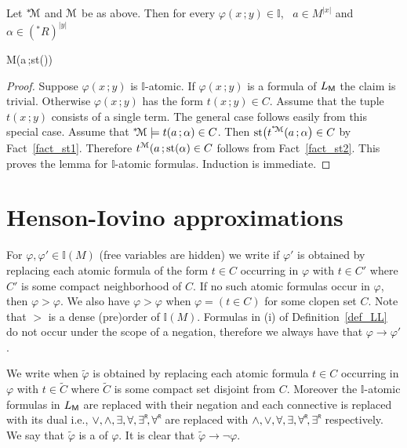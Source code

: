 \documentclass[11pt,oneside]{amsart}
\renewcommand*{\emph}[1]{%
   \smash{\tikz[baseline]\node[rectangle, fill=teal!25, rounded corners, inner xsep=0.5ex, inner ysep=0.2ex, anchor=base, minimum height = 2.7ex]{#1};}}
\begin{document}

\begin{lemma}\label{lem_st}
  Let ${}^*{\!\EuScript M}$ and ${\EuScript M}$ be as above.
  Then for every $\varphi(x\,;y)\in\mathds{I}$, \  $a\in M^{|x|}$ and $\alpha\in({}^*\!R)^{|y|}$ 
  
  {\Rightarrow}
  {{\EuScript M}\models\varphi\big(a\,;{\rm st}(\alpha)\big)}
\end{lemma}

\begin{proof}
  Suppose $\varphi(x\,;y)$ is $\mathds{I}$-atomic.
  If $\varphi(x\,;y)$ is a formula of $L_{\sf M}$ the claim is trivial. 
  Otherwise $\varphi(x\,;y)$ has the form $t(x\,;y)\in C$.
  Assume that the tuple $t(x\,;y)$ consists of a single term.
  The general case follows easily from this special case. 
  Assume that ${}^*{\!\EuScript M}\models t(a\,;\alpha)\in C$.
  Then ${\rm st}\big(t^{{}^*{\!\EuScript M}}(a\,;\alpha\big)\in C$ by Fact~\ref{fact_st1}.
  Therefore $t^{{\EuScript M}}(a\,;{\rm st}(\alpha)\in C$ follows from Fact~\ref{fact_st2}.
  This proves the lemma for $\mathds{I}$-atomic formulas.
  Induction is immediate. 
\end{proof}



\section{Henson-Iovino approximations}\label{ultrapws}


For $\varphi,\varphi'\in\mathds{I}(M)$ (free variables are hidden) we write \emph{$\varphi'>\varphi$\/} if $\varphi'$ is obtained by replacing each atomic formula of the form $t\in C$ occurring in $\varphi$ with $t\in C'$ where $C'$ is some compact neighborhood of $C$.
If no such atomic formulas occur in $\varphi$, then $\varphi>\varphi$.
We also have $\varphi>\varphi$ when $\varphi=(t\in C)$ for some clopen set $C$.
Note that $>$ is a dense (pre)order of $\mathds{I}(M)$.
Formulas in (i) of Definition~\ref{def_LL} do not occur under the scope of a negation, therefore we always have that $\varphi\to\varphi'$.

We write \emph{$\tilde{\varphi}\perp\varphi$\/} when $\tilde{\varphi}$ is obtained by replacing each atomic formula $t\in C$ occurring in $\varphi$ with $t\in\tilde{C}$ where $\tilde{C}$ is some compact set disjoint from $C$.
Moreover the $\mathds{I}$-atomic formulas in $L_{\sf M}$ are replaced with their negation and each connective is replaced with its dual i.e., $\vee, \wedge, \exists, \forall, \existsR , \forallR $ are replaced with $\wedge,\vee,\forall,\exists,\forallR ,\existsR $ respectively.
We say that  $\tilde{\varphi}$ is a \emph{strong negation} of $\varphi$.
It is clear that $\tilde{\varphi}\rightarrow\neg\varphi$.
\end{document}
